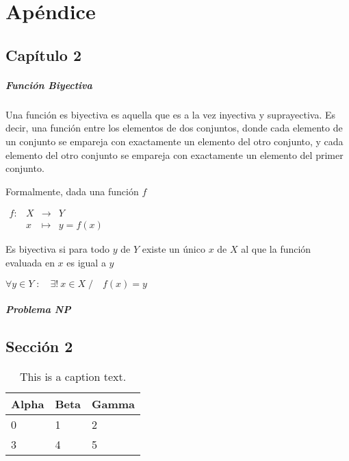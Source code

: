 
\chapter{Apéndice}
\label{sec:appendix}

{
\color{gray}
\Blindtext[1][1]
}

\section{Capítulo 2}
\label{sec:appendix:sec2}

\paragraph{Función Biyectiva}

Una función es biyectiva es aquella que es a la vez inyectiva y suprayectiva. Es decir, una función entre los elementos de dos conjuntos, donde cada elemento de un conjunto se empareja con exactamente un elemento del otro conjunto, y cada elemento del otro conjunto se empareja con exactamente un elemento del primer conjunto.

Formalmente, dada una función $f$

$ {\begin{array}{rccl}f:&X&\longrightarrow &Y\\&x&\longmapsto &y=f(x)\end{array}} $

Es biyectiva si para todo $y$ de $Y$ existe un único $x$ de $X$ al que la función evaluada en $x$ es igual a $y$

$ \forall y\in Y\;:\quad \exists !\ x\in X\;/\quad f(x)=y $

\paragraph{Problema NP}



\section{Sección 2}
\label{sec:appendix:sec2}


{
\color{gray}
\Blindtext[1][1]

\begin{table}[h]
	\begin{tabularx}{\textwidth}{X | X | X}
		Alpha		& Beta			& Gamma			\\ \hline
		0			& 1				& 2				\\ \hline
		3			& 4				& 5				\\ %
	\end{tabularx}
	\label{tab:table2}
	\caption{This is a caption text.}
\end{table}


\Blindtext[1][2]
}